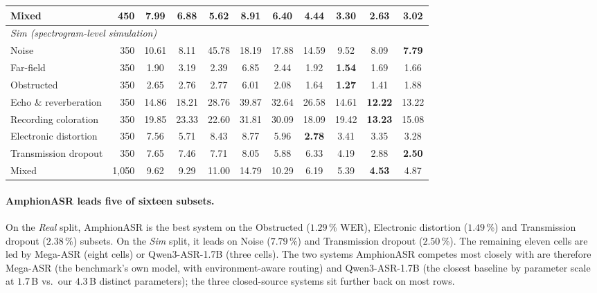 \begin{table}[t]
\begin{tabular}{l@{\hspace{3pt}}rccccccccc}
    Mixed                  & 450  & 7.99  & 6.88  & 5.62  & 8.91  & 6.40  & 4.44  & 3.30  & \textbf{2.63} & 3.02 \\
    \midrule
    \multicolumn{11}{l}{\emph{Sim (spectrogram-level simulation)}} \\
    \midrule
    Noise                  & 350   & 10.61 & 8.11  & 45.78 & 18.19 & 17.88 & 14.59 & 9.52  & 8.09  & \textbf{7.79} \\
    Far-field              & 350   & 1.90  & 3.19  & 2.39  & 6.85  & 2.44  & 1.92  & \textbf{1.54} & 1.69  & 1.66 \\
    Obstructed             & 350   & 2.65  & 2.76  & 2.77  & 6.01  & 2.08  & 1.64  & \textbf{1.27} & 1.41  & 1.88 \\
    Echo \& reverberation  & 350   & 14.86 & 18.21 & 28.76 & 39.87 & 32.64 & 26.58 & 14.61 & \textbf{12.22} & 13.22 \\
    Recording coloration   & 350   & 19.85 & 23.33 & 22.60 & 31.81 & 30.09 & 18.09 & 19.42 & \textbf{13.23} & 15.08 \\
    Electronic distortion  & 350   & 7.56  & 5.71  & 8.43  & 8.77  & 5.96  & \textbf{2.78} & 3.41  & 3.35  & 3.28 \\
    Transmission dropout   & 350   & 7.65  & 7.46  & 7.71  & 8.05  & 5.88  & 6.33  & 4.19  & 2.88  & \textbf{2.50} \\
    Mixed                  & 1{,}050 & 9.62  & 9.29  & 11.00 & 14.79 & 10.29 & 6.19  & 5.39  & \textbf{4.53} & 4.87 \\
    \bottomrule
  \end{tabular}
\end{table}

\paragraph{AmphionASR leads five of sixteen subsets.}
On the \emph{Real} split, AmphionASR is the best system on the
Obstructed ($1.29$\,\% WER), Electronic distortion ($1.49$\,\%) and
Transmission dropout ($2.38$\,\%) subsets. On the \emph{Sim} split,
it leads on Noise ($7.79$\,\%) and Transmission dropout
($2.50$\,\%). The remaining eleven cells are led by Mega-ASR
(eight cells) or Qwen3-ASR-1.7B (three cells). The two systems
AmphionASR competes most closely with are therefore Mega-ASR
(the benchmark's own model, with environment-aware routing) and
Qwen3-ASR-1.7B (the closest baseline by parameter scale at
$1.7$\,B vs.\ our $4.3$\,B distinct parameters); the three
closed-source systems sit further back on most rows.

